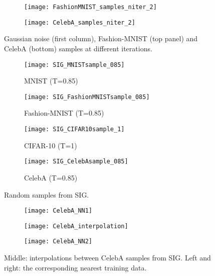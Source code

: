 \documentclass{article}
\begin{document}
\begin{figure}
     \centering
     \begin{subfigure}[]{\linewidth}
         \centering \texttt{[image: FashionMNIST\_samples\_niter\_2]}
     \end{subfigure}
     \hfill
     \begin{subfigure}[]{\linewidth}
         \centering \texttt{[image: CelebA\_samples\_niter\_2]}
     \end{subfigure}
     \caption{Gaussian noise (first column), Fashion-MNIST (top panel) and CelebA (bottom) samples at different iterations.}
     \label{fig:iteration}
     \vskip -0.1in
\end{figure}

\begin{figure}
     \centering
     \begin{subfigure}[b]{0.495\linewidth}
         \centering
         \texttt{[image: SIG\_MNISTsample\_085]}
         \caption{MNIST (T=0.85)}
     \end{subfigure}
     \hfill
     \begin{subfigure}[b]{0.495\linewidth}
         \centering
         \texttt{[image: SIG\_FashionMNISTsample\_085]}
         \caption{Fashion-MNIST (T=0.85)}
     \end{subfigure}
     \hfill
     \begin{subfigure}[b]{0.495\linewidth}
         \centering
         \texttt{[image: SIG\_CIFAR10sample\_1]}
         \caption{CIFAR-10 (T=1)}
     \end{subfigure}
     \hfill
     \begin{subfigure}[b]{0.495\linewidth}
         \centering
         \texttt{[image: SIG\_CelebAsample\_085]}
         \caption{CelebA (T=0.85)}
     \end{subfigure}
     \caption{Random samples from SIG.}
     \label{fig:sample}
     \vskip -0.1in
\end{figure}


\begin{figure}
     \centering
     \begin{subfigure}[]{0.08\linewidth}
         \centering \texttt{[image: CelebA\_NN1]}
     \end{subfigure}
     \hfill
     \begin{subfigure}[]{0.8\linewidth}
         \centering \texttt{[image: CelebA\_interpolation]}
     \end{subfigure}
     \hfill
     \begin{subfigure}[]{0.08\linewidth}
         \centering \texttt{[image: CelebA\_NN2]}
     \end{subfigure}
     \caption{Middle: interpolations between CelebA samples from SIG. Left and right: the corresponding nearest training data.}
     \label{fig:interpolation}
     \vskip -0.1in
\end{figure}
\end{document}
